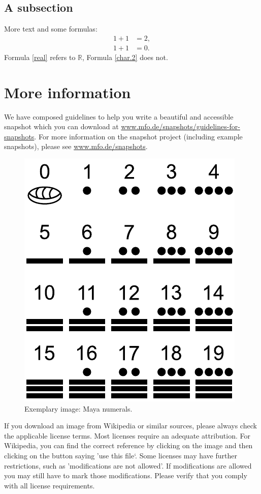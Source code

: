 \documentclass{snapshotmfo}
\begin{document}
\subsection{A subsection}
More text and some formulas:
\begin{align}\label{real}
1+1&=2,\\\label{char.2}
1+1&=0.
\end{align}
Formula \eqref{real} refers to $\mathbb{R}$, Formula \eqref{char.2} does not.

\section{More information}
We have composed guidelines to help you write a beautiful and accessible snapshot which you can download at \href{https://www.mfo.de/snapshots/guidelines-for-snapshots}{www.mfo.de/snapshots/guidelines-for-snapshots}. For more information on the snapshot project (including example snapshots), please see \href{https://www.mfo.de/snapshots}{www.mfo.de/snapshots}.

\begin{figure}[ht]
        \centering 
        \includegraphics[width= 0.33 \textwidth]{maya.pdf}
        \caption{Exemplary image: Maya numerals.}
\label{fig:maya}
\end{figure}

If you download an image from Wikipedia or similar sources, please always check the applicable license terms. Most licenses require an adequate attribution. For Wikipedia, you can find the correct reference by clicking on the image and then clicking on the button saying 'use this file‘. Some licenses may have further restrictions, such as 'modifications are not allowed'. If modifications are allowed you may still have to mark those modifications. Please verify that you comply with all license requirements.
\end{document}
